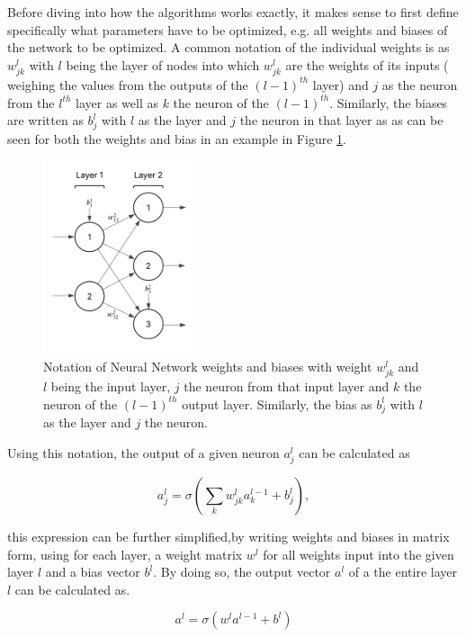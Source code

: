  Before diving into how the algorithms works exactly, it makes sense to first define specifically what parameters have to be optimized, e.g. all weights and biases of the network to be optimized. A common notation of the individual weights is as $w_{jk}^l$ with $l$ being the layer of nodes into which $w_{jk}^l$ are the weights of its inputs ( weighing the values from the outputs of the $(l-1)^{th}$ layer) and $j$ as the neuron from the $l^{th}$ layer as well as $k$ the neuron of the  $(l-1)^{th}$. Similarly, the biases are written as $b_j^l$ with $l$ as the layer and $j$ the neuron in that layer as as can be seen for both the weights and bias in an example in Figure \ref{fig:bias_and_weights_notation}.
 
 
 \begin{figure}[h] 
 	\centering
 	\includegraphics[width=0.4\textwidth]{figures/modelling/bias_and_weights_notation.png} 
 	\caption{Notation of Neural Network weights and biases with weight $w_{jk}^l$ and $l$ being the input layer,  $j$ the neuron from that input layer and $k$ the neuron of the  $(l-1)^{th}$ output layer. Similarly, the bias as $b_j^l$ with $l$ as the layer and $j$ the neuron.}
 	\label{fig:bias_and_weights_notation}
 \end{figure}
 
 Using this notation, the output of a given neuron $a_j^l$ can be calculated as 
 
 $$
 a_j^l = \sigma\left( \sum_k w_{jk}^l a_k^{l-1} + b_j^l \right),
 $$
 
 this expression can be further simplified,by writing weights and biases in matrix form, using for each layer, a weight matrix $w^l$ for all weights input into the given layer $l$ and a bias vector $b^l$. By doing so, the output vector $a^l$ of a the entire layer $l$ can be calculated as.
 
 $$a^l = \sigma (w^la^{l-1}+b^l)$$
 
